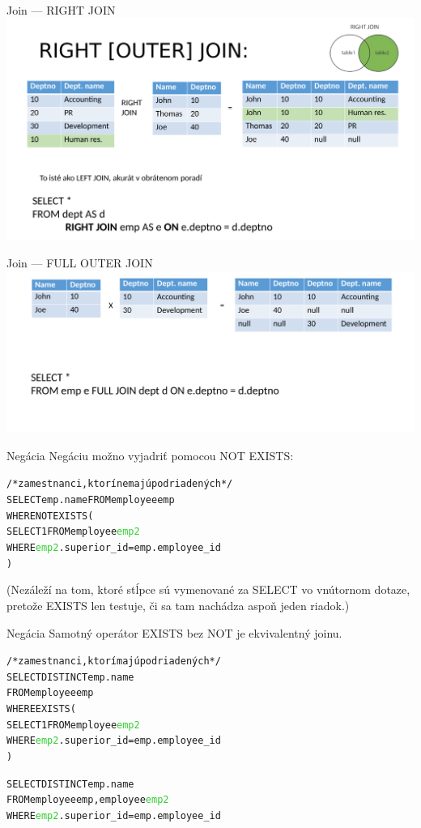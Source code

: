 \documentclass[12pt]{beamer}
\def\blue#1{\textcolor{Cerulean}{#1}}
\def\green#1{\textcolor{LimeGreen}{#1}}
\begin{document}
\begin{frame}{Join --- RIGHT JOIN}
\includegraphics[scale=.12]{join4}
\end{frame}

\begin{frame}{Join --- FULL OUTER JOIN}
\includegraphics[scale=.12]{join5}
\end{frame}

\begin{frame}[fragile]{Negácia}
Negáciu možno vyjadriť pomocou \alert{NOT EXISTS}:
\begin{alltt}
/* zamestnanci, ktorí nemajú podriadených */
SELECT emp.name FROM employee \blue{emp}
WHERE \alert{NOT EXISTS} (
    SELECT 1 FROM employee \green{emp2}
    WHERE \green{emp2}.superior_id = \blue{emp}.employee_id
)
\end{alltt}
(Nezáleží na tom, ktoré stĺpce sú vymenované za SELECT vo vnútornom dotaze, pretože EXISTS len testuje, či sa tam nachádza aspoň jeden riadok.)
\end{frame}

\begin{frame}[fragile]{Negácia}
Samotný operátor EXISTS bez NOT je ekvivalentný joinu.
\begin{alltt}
/* zamestnanci, ktorí majú podriadených */
SELECT DISTINCT emp.name
FROM employee \blue{emp}
WHERE \alert{EXISTS} (
    SELECT 1 FROM employee \green{emp2}
    WHERE \green{emp2}.superior_id = \blue{emp}.employee_id
)

SELECT DISTINCT emp.name
FROM employee \blue{emp}, employee \green{emp2}
WHERE \green{emp2}.superior_id = \blue{emp}.employee_id
\end{alltt}
\end{frame}
\end{document}
